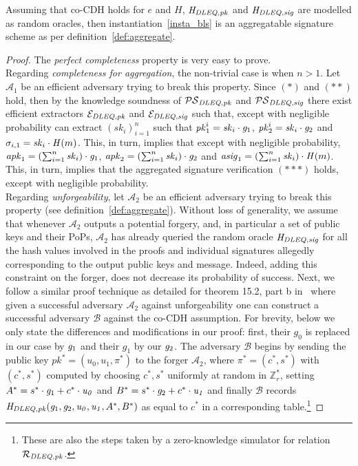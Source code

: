 \begin{theorem} Assuming that co-CDH holds for $e$ and $H$, $\mathit{H}_{\mathit{DLEQ}, \mathit{pk}}$ and $\mathit{H}_{\mathit{DLEQ}, \mathit{sig}}$ are modelled as random oracles, 
then instantiation~\ref{insta_bls} is an aggregatable signature scheme as per definition~\ref{def:aggregate}. 
\end{theorem}
\begin{proof} The \emph{perfect completeness} property is very easy to prove. \\ 

\noindent Regarding \emph{completeness for aggregation}, the non-trivial case is when $n>1$. 
Let $\mathcal{A}_1$ be an efficient adversary trying to break this property. Since $(\ast)$ and $(\ast\ast)$ hold, then by the 
knowledge soundness of $\mathcal{PS}_{\mathit{DLEQ}, \mathit{pk}}$ and $\mathcal{PS}_{\mathit{DLEQ}, \mathit{sig}}$ there exist efficient extractors $\mathcal{E}_{\mathit{DLEQ},\mathit{pk}}$ and $\mathcal{E}_{\mathit{DLEQ},\mathit{sig}}$ such that, except with negligible probability can 
extract $(\mathit{sk}_i)_{i=1}^n$ such that $\mathit{pk}_1^i = \mathit{sk}_i \cdot \mathit{g}_{1}$, $\mathit{pk}_2^i = \mathit{sk}_i \cdot\mathit{g}_{2}$ 
and $\sigma_{i,1} = \mathit{sk}_i \cdot \mathit{H}(m)$. This, in turn, implies that except with negligible probability, 
$\mathit{apk}_1 = (\sum_{i=1}^n \mathit{sk}_i) \cdot \mathit{g}_{1}$, $\mathit{apk}_2 = (\sum_{i=1}^n \mathit{sk}_i) \cdot \mathit{g}_{2}$ and 
$\mathit{asig}_1 = (\sum_{i=1}^n \mathit{sk}_i) \cdot \mathit{H}(m)$. This, in turn, implies that the aggregated signature verification $(\ast\ast\ast)$ holds, except 
with negligible probability. \\ 

\noindent Regarding \emph{unforgeability}, let $\mathcal{A}_2$ be an efficient adversary trying to break this property (see definition~\ref{def:aggregate}). 
Without loss of generality, we assume that whenever $\mathcal{A}_2$ outputs a potential forgery, and, in particular a set of public keys and their PoPs, 
$\mathcal{A}_2$ has already queried the random oracle $\mathit{H}_{\mathit{DLEQ}, \mathit{sig}}$ for all the hash values involved in the proofs and individual signatures allegedly corresponding to the
output public keys and message. Indeed, adding this constraint on the forger, does not decrease its probability of success. Next, we follow a similar 
proof technique as detailed for theorem 15.2, part b in~\cite{dabo_book} where given a successful adversary $\mathcal{A}_2$ against unforgeability one 
can construct a successful adversary $\mathcal{B}$ against the co-CDH assumption. For brevity, below we only state the differences and modifications in our proof: 
first, their $g_0$ is replaced in our case by $\mathit{g}_{1}$ and their $g_1$ by our $\mathit{g}_{2}$. The adversary $\mathcal{B}$ begins by sending the public 
key $\mathit{pk^*}= (u_0, u_1, \pi^*)$ to the forger $\mathcal{A}_2$, where $\pi^* = (c^*, s^*)$ with $(c^*, s^*)$ computed by choosing $c^*, s^*$ uniformly at random in 
$\mathbb{Z}_r^*$, setting $A^* = s^* \cdot \mathit{g}_{1} + c^* \cdot \mathit{u_0}$ and $B^* = s^* \cdot \mathit{g}_{2}  + c^* \cdot \mathit{u_1}$ and 
finally $\mathcal{B}$ records $\mathit{H}_{\mathit{DLEQ}, \mathit{pk}} (\mathit{g}_{1}, \mathit{g}_{2}, \mathit{u_0}, \mathit{u_1}, A^*, B^*)$ as equal to $c^*$ in a corresponding table.\footnote{These are also the steps taken by a zero-knowledge simulator for relation $\mathcal{R}_{\mathit{DLEQ},\mathit{pk}}$.} 


\end{proof}
